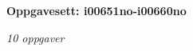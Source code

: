 \centerline{\bf Oppgavesett: i00651no-i00660no}
\vskip 10pt
\centerline{\it 10 oppgaver}\vskip 10pt
\vskip 10pt
